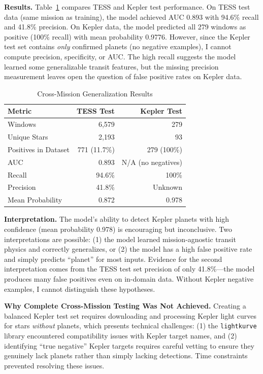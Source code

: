 \textbf{Results.} Table~\ref{tab:crossmission_results} compares TESS and Kepler test performance. On TESS test data (same mission as training), the model achieved AUC 0.893 with 94.6\% recall and 41.8\% precision. On Kepler data, the model predicted all 279 windows as positive (100\% recall) with mean probability 0.9776. However, since the Kepler test set contains \textit{only} confirmed planets (no negative examples), I cannot compute precision, specificity, or AUC. The high recall suggests the model learned some generalizable transit features, but the missing precision measurement leaves open the question of false positive rates on Kepler data.

\begin{table}[h]
\centering
\caption{Cross-Mission Generalization Results}
\label{tab:crossmission_results}
\begin{tabular}{@{}lrr@{}}
\toprule
\textbf{Metric} & \textbf{TESS Test} & \textbf{Kepler Test} \\
\midrule
Windows & 6,579 & 279 \\
Unique Stars & 2,193 & 93 \\
Positives in Dataset & 771 (11.7\%) & 279 (100\%) \\
\midrule
AUC & 0.893 & N/A (no negatives) \\
Recall & 94.6\% & 100\% \\
Precision & 41.8\% & Unknown \\
Mean Probability & 0.872 & 0.978 \\
\bottomrule
\end{tabular}
\end{table}

\textbf{Interpretation.} The model's ability to detect Kepler planets with high confidence (mean probability 0.978) is encouraging but inconclusive. Two interpretations are possible: (1) the model learned mission-agnostic transit physics and correctly generalizes, or (2) the model has a high false positive rate and simply predicts ``planet'' for most inputs. Evidence for the second interpretation comes from the TESS test set precision of only 41.8\%---the model produces many false positives even on in-domain data. Without Kepler negative examples, I cannot distinguish these hypotheses.

\textbf{Why Complete Cross-Mission Testing Was Not Achieved.} Creating a balanced Kepler test set requires downloading and processing Kepler light curves for stars \textit{without} planets, which presents technical challenges: (1) the \texttt{lightkurve} library encountered compatibility issues with Kepler target names, and (2) identifying ``true negative'' Kepler targets requires careful vetting to ensure they genuinely lack planets rather than simply lacking detections. Time constraints prevented resolving these issues.

